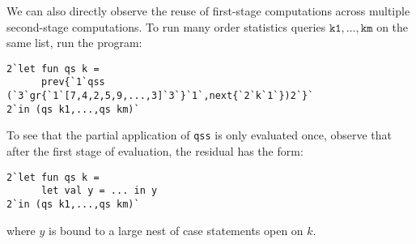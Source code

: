 We can also directly observe the reuse of first-stage computations across
multiple second-stage computations. To run many order statistics queries
$\texttt{k1},\dots,\texttt{km}$ on the same list, run the program:
\begin{lstlisting}
2`let fun qs k = 
      prev{`1`qss (`3`gr{`1`[7,4,2,5,9,...,3]`3`}`1`,next{`2`k`1`})2`}`
2`in (qs k1,...,qs km)`
\end{lstlisting}
To see that the partial application of \texttt{qss} is only evaluated once,
observe that after the first stage of evaluation, the residual has the form:
\begin{lstlisting}
2`let fun qs k = 
	  let val y = ... in y
2`in (qs k1,...,qs km)`
\end{lstlisting}
where $y$ is bound to a large nest of case statements open on $k$.
